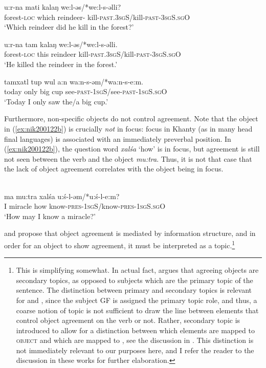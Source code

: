 \documentclass[output=paper
,modfonts
,nonflat]{langsci/langscibook}
\begin{document}
\begin{exe}
\ex \citet[][143]{dn2011}
\begin{xlist}
\ex
{\gll u:r-na mati kalaŋ we:l-əs/*we:l-s-əlli?\\
forest-\textsc{loc} which reindeer- kill-\textsc{past.3sgS}/kill-\textsc{past-3sgS.sgO}\\
\glt `Which reindeer did he kill in the forest?'} \label{ex:focwh}

\ex
{\gll u:r-na tam kalaŋ we:l-əs/*we:l-s-əlli.\\
forest-\textsc{loc} this reindeer kill-\textsc{past.3sgS}/kill-\textsc{past-3sgS.sgO}\\
\glt `He killed the reindeer in the forest.'} \label{ex:focanswer}

\ex
{\gll tamxatl tup wul a:n wa:n-s-əm/*wa:n-s-e:m.\\
today only big cup see-\textsc{past-1sgS}/see-\textsc{past-1sgS.sgO}\\
\glt `Today I only saw the/a big cup.'} \label{ex:focpart}
\end{xlist} 
\end{exe}

\noindent Furthermore, non-specific objects do not control agreement.
Note that the object in (\ref{ex:nik200122b}) is crucially \textit{not} in focus: focus in Khanty (as in many head final languages) is associated with an immediately preverbal position. 
In (\ref{ex:nik200122b}), the question word \textit{xal\'{s}a} `how' is in focus, but agreement is still not seen between the verb and the object \textit{mu:tra}.
Thus, it is not that case that the lack of object agreement correlates with the object being in focus.

\begin{exe}
\ex \citet[][20]{nikolaeva2001}\\
{\gll ma mu:tra xal\'{s}a u:\'{s}-l-əm/*u:\'{s}-l-e:m?\\
I miracle how know-\textsc{pres-1sgS}/know-\textsc{pres-1sgS.sgO}\\
\glt `How may I know a miracle?'} \label{ex:nik200122b}
\end{exe}


\noindent \citet{nikolaeva2001} and \citet{dn2011} propose that object agreement is mediated by information structure, and in order for an object to show agreement, it must be interpreted as a topic.\footnote{This is simplifying somewhat.
In actual fact, \citet{nikolaeva2001} argues that agreeing objects are secondary topics, as opposed to subjects which are the primary topic of the sentence.
The distinction between primary and secondary topics is relevant for \cite{nikolaeva2001} and \cite{dn2011}, since the subject GF is assigned the primary topic role, and thus, a coarse notion of topic is not sufficient to draw the line between elements that control object agreement on the verb or not.
Rather, secondary topic is introduced to allow for a distinction between which elements are mapped to \textsc{object} and which are mapped to \robj, see the discussion in .
This distinction is not immediately relevant to our purposes here, and I refer the reader to the discussion in these works for further elaboration.}
\end{document}
